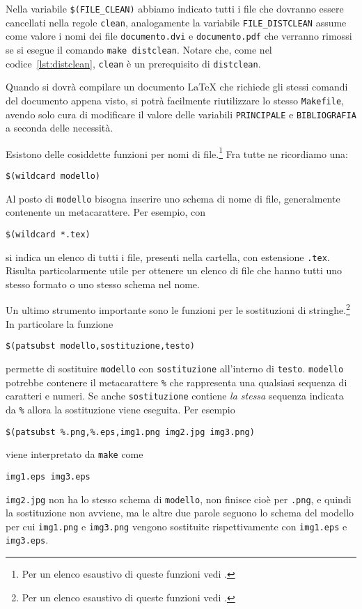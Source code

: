Nella variabile \verb|$(FILE_CLEAN)|
abbiamo indicato tutti i file che dovranno essere cancellati nella regole
\verb|clean|, analogamente la variabile \verb|FILE_DISTCLEAN| assume come valore
i nomi dei file \verb|documento.dvi| e \verb|documento.pdf| che verranno rimossi
se si esegue il comando \verb|make distclean|.  Notare che, come nel
codice~\ref{lst:distclean}, \verb|clean| è un prerequisito di \verb|distclean|.

Quando si dovrà compilare un documento \LaTeX{}
che richiede gli stessi comandi del documento appena visto, si potrà facilmente
riutilizzare lo stesso \verb|Makefile|, avendo solo cura di modificare il valore
delle variabili \verb|PRINCIPALE| e \verb|BIBLIOGRAFIA| a seconda delle
necessità. %

Esistono delle cosiddette funzioni per nomi di
file.\footnote{Per un elenco esaustivo di queste funzioni vedi
  \textcite[83]{gnu:make}.} Fra tutte ne ricordiamo una:
\begin{lstlisting}
$(wildcard modello)
\end{lstlisting}
Al posto di \verb|modello| bisogna inserire uno schema di nome di file,
generalmente contenente un metacarattere. Per esempio, con
\begin{lstlisting}
$(wildcard *.tex)
\end{lstlisting}
si indica un elenco di tutti i file, presenti nella cartella, con estensione
\verb|.tex|.  Risulta particolarmente utile per ottenere un elenco di file che
hanno tutti uno stesso formato o uno stesso schema nel nome.

Un ultimo strumento importante sono le funzioni per le sostituzioni di
stringhe.\footnote{Per un elenco esaustivo di queste funzioni vedi
  \textcite[80]{gnu:make}.}  In particolare la funzione
\begin{lstlisting}
$(patsubst modello,sostituzione,testo)
\end{lstlisting}
permette di sostituire \verb|modello| con \verb|sostituzione| all'interno di
\verb|testo|.  \verb|modello| potrebbe contenere il metacarattere \verb|%| che
rappresenta una qualsiasi sequenza di caratteri e numeri.  Se anche
\verb|sostituzione| contiene \emph{la stessa} sequenza indicata da \verb|%|
allora la sostituzione viene eseguita.  Per esempio
\begin{lstlisting}
$(patsubst %.png,%.eps,img1.png img2.jpg img3.png)
\end{lstlisting}
viene interpretato da \verb|make| come
\begin{verbatim}
img1.eps img3.eps
\end{verbatim}
\verb|img2.jpg| non ha lo stesso schema di \verb|modello|, non finisce cioè per
\verb|.png|, e quindi la sostituzione non avviene, ma le altre due parole
seguono lo schema del modello per cui \verb|img1.png| e \verb|img3.png| vengono
sostituite rispettivamente con \verb|img1.eps| e \verb|img3.eps|.


